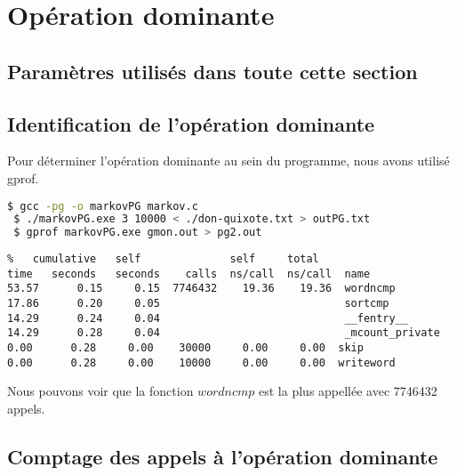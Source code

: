 
\section{Opération dominante}

\subsection{Paramètres utilisés dans toute cette section}

\subsection{Identification de l'opération dominante}

Pour déterminer l'opération dominante au sein du programme, nous avons utilisé gprof.


\begin{lstlisting}[language=bash]
 $ gcc -pg -o markovPG markov.c
 $ ./markovPG.exe 3 10000 < ./don-quixote.txt > outPG.txt
 $ gprof markovPG.exe gmon.out > pg2.out
\end{lstlisting}

\begin{verbatim}
%   cumulative   self              self     total           
time   seconds   seconds    calls  ns/call  ns/call  name    
53.57      0.15     0.15  7746432    19.36    19.36  wordncmp
17.86      0.20     0.05                             sortcmp
14.29      0.24     0.04                             __fentry__
14.29      0.28     0.04                             _mcount_private
0.00      0.28     0.00    30000     0.00     0.00  skip
0.00      0.28     0.00    10000     0.00     0.00  writeword
\end{verbatim}
Nous pouvons voir que la fonction $wordncmp$ est la plus appellée avec 7746432 appels.





\subsection{Comptage des appels à l'opération dominante}

